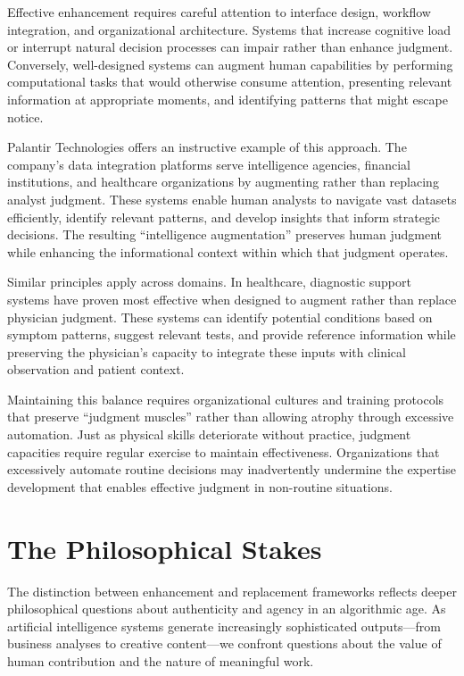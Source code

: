 \documentclass[
  Letterpaper,
]{scrbook}
\begin{document}
Effective enhancement requires careful attention to interface design,
workflow integration, and organizational architecture. Systems that
increase cognitive load or interrupt natural decision processes can
impair rather than enhance judgment. Conversely, well-designed systems
can augment human capabilities by performing computational tasks that
would otherwise consume attention, presenting relevant information at
appropriate moments, and identifying patterns that might escape notice.

Palantir Technologies offers an instructive example of this approach.
The company's data integration platforms serve intelligence agencies,
financial institutions, and healthcare organizations by augmenting
rather than replacing analyst judgment. These systems enable human
analysts to navigate vast datasets efficiently, identify relevant
patterns, and develop insights that inform strategic decisions. The
resulting ``intelligence augmentation'' preserves human judgment while
enhancing the informational context within which that judgment operates.

Similar principles apply across domains. In healthcare, diagnostic
support systems have proven most effective when designed to augment
rather than replace physician judgment. These systems can identify
potential conditions based on symptom patterns, suggest relevant tests,
and provide reference information while preserving the physician's
capacity to integrate these inputs with clinical observation and patient
context.

Maintaining this balance requires organizational cultures and training
protocols that preserve ``judgment muscles'' rather than allowing
atrophy through excessive automation. Just as physical skills
deteriorate without practice, judgment capacities require regular
exercise to maintain effectiveness. Organizations that excessively
automate routine decisions may inadvertently undermine the expertise
development that enables effective judgment in non-routine situations.

\section{The Philosophical Stakes}\label{the-philosophical-stakes}

The distinction between enhancement and replacement frameworks reflects
deeper philosophical questions about authenticity and agency in an
algorithmic age. As artificial intelligence systems generate
increasingly sophisticated outputs---from business analyses to creative
content---we confront questions about the value of human contribution
and the nature of meaningful work.
\end{document}
